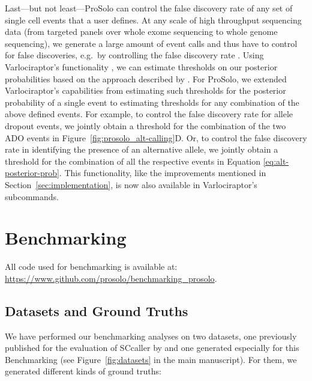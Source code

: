 \documentclass[authoryear,preprint,11pt]{scrartcl}
\begin{document}
Last---but not least---ProSolo can control the false discovery rate of any set of single cell events that a user defines.
At any scale of high throughput sequencing data (from targeted panels over whole exome sequencing to whole genome sequencing), we generate a large amount of event calls and thus have to control for false discoveries, e.g.~by controlling the false discovery rate \citep{benjamini_controlling_1995}.
Using Varlociraptor's functionality \citep{koster_varlociraptor_2020}, we can estimate thresholds on our posterior probabilities based on the approach described by \cite{muller_optimal_2004,muller_fdr_2006}.
For ProSolo, we extended Varlociraptor's capabilities from estimating such thresholds for the posterior probability of a single event to estimating thresholds for any combination of the above defined events.
For example, to control the false discovery rate for allele dropout events, we jointly obtain a threshold for the combination of the two ADO events in Figure~\ref{fig:prosolo_alt-calling}D.
Or, to control the false discovery rate in identifying the presence of an alternative allele, we jointly obtain a threshold for the combination of all the respective events in Equation \ref{eq:alt-posterior-prob}. 
This functionality, like the improvements mentioned in Section~\ref{sec:implementation}, is now also available in Varlociraptor's subcommands.


\section{Benchmarking} \label{sec:suppl-benchmarking}

All code used for benchmarking is available at: \url{https://www.github.com/prosolo/benchmarking_prosolo}.

\subsection{Datasets and Ground Truths} \label{sec:suppl-datasets}

We have performed our benchmarking analyses on two datasets, one previously published for the evaluation of SCcaller by \cite{dong_accurate_2017} and one generated especially for this Benchmarking (see Figure~\ref{fig:datasets} in the main manuscript).
For them, we generated different kinds of ground truths:\\
\end{document}
